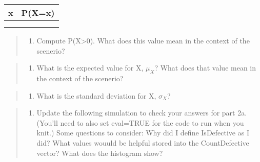 \documentclass[
]{article}
\providecommand{\tightlist}{%
  \setlength{\itemsep}{0pt}\setlength{\parskip}{0pt}}
\begin{document}
\begin{longtable}[]{@{}cc@{}}
\toprule()
x & P(X=x) \\
\midrule()
\endhead
& \\
& \\
\bottomrule()
\end{longtable}

\begin{quote}
\begin{enumerate}
\def\labelenumi{\alph{enumi}.}
\setcounter{enumi}{1}
\tightlist
\item
  Compute P(X\textgreater0). What does this value mean in the context of
  the scenerio?
\end{enumerate}
\end{quote}

\begin{quote}
\begin{enumerate}
\def\labelenumi{\alph{enumi}.}
\setcounter{enumi}{2}
\tightlist
\item
  What is the expected value for X, \(\mu_X\)? What does that value mean
  in the context of the scenerio?
\end{enumerate}
\end{quote}

\begin{quote}
\begin{enumerate}
\def\labelenumi{\alph{enumi}.}
\setcounter{enumi}{3}
\tightlist
\item
  What is the standard deviation for X, \(\sigma_X\)?
\end{enumerate}
\end{quote}

\begin{quote}
\begin{enumerate}
\def\labelenumi{\alph{enumi}.}
\setcounter{enumi}{4}
\tightlist
\item
  Update the following simulation to check your answers for part 2a.
  (You'll need to also set eval=TRUE for the code to run when you knit.)
  Some questions to consider: Why did I define IsDefective as I did?
  What values wouuld be helpful stored into the CountDefective vector?
  What does the histogram show?
\end{enumerate}
\end{quote}
\end{document}
